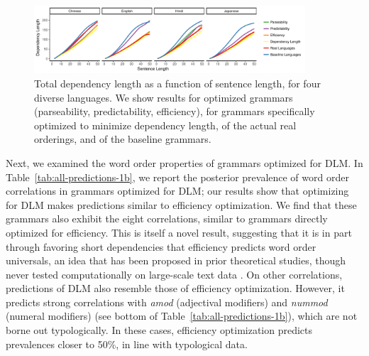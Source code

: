 \documentclass[10pt,twoside,lineno]{article}
\begin{document}
\begin{figure}[ht]
    \centering
	\includegraphics[width=0.9\textwidth]{depLength-facet-1.png} 
        \caption{Total dependency length as a function of sentence length, for four diverse languages. We show results for optimized grammars (parseability, predictability, efficiency), for grammars specifically optimized to minimize dependency length, of the actual real orderings, and of the baseline grammars.}
    \label{fig:dlm-4langs}
\end{figure}


Next, we examined the word order properties of grammars optimized for DLM.
In Table~\ref{tab:all-predictions-1b}, we report the posterior prevalence of word order correlations in grammars optimized for DLM; our results show that optimizing for DLM makes predictions similar to efficiency optimization.
We find that these grammars also exhibit the eight correlations, similar to grammars directly optimized for efficiency.
This is itself a novel result, suggesting that it is in part through favoring short dependencies that efficiency predicts word order universals, an idea that has been proposed in prior theoretical studies, though never tested computationally on large-scale text data \citep{kuno1974position,rijkhoff1986word,frazier1985syntactic,rijkhoff1990explaining,hawkins1994performance, hawkins2004efficiency}.
On other correlations, predictions of DLM also resemble those of efficiency optimization.
However, it predicts strong correlations with \textit{amod} (adjectival modifiers) and \textit{nummod} (numeral modifiers) (see bottom of Table~\ref{tab:all-predictions-1b}), which are not borne out typologically.
In these cases, efficiency optimization predicts prevalences closer to 50\%, in line with typological data.
\end{document}
